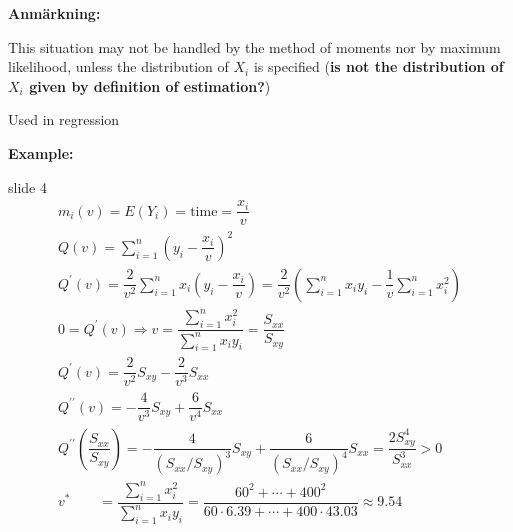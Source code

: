 \par\bigskip
\noindent\textbf{Anmärkning:}\par
\noindent  This situation may not be handled by the method of moments nor by maximum likelihood, unless the distribution of $X_i$ is specified (\textbf{is not the distribution of $X_i$ given by definition of estimation?})
\par\bigskip
\noindent Used in regression 
\par\bigskip
\noindent\textbf{Example:}\par
slide 4
\begin{equation*}
  \begin{gathered}
    m_i(v) = E(Y_i) = \text{time} = \dfrac{x_i}{v}\\
    Q(v) = \sum_{i=1}^{n}\left(y_i-\dfrac{x_i}{v}\right)^2\\
    Q^{\prime}(v) = \dfrac{2}{v^2}\sum_{i=1}^{n}x_i\left(y_i-\dfrac{x_i}{v}\right) = \dfrac{2}{v^2}\left(\sum_{i=1}^{n}x_iy_i-\dfrac{1}{v}\sum_{i=1}^{n}x_i^2\right)\\
    0  =Q^{\prime}(v)\Rightarrow v = \dfrac{\sum_{i=1}^{n}x_i^2}{\sum_{i=1}^{n}x_iy_i} = \dfrac{S_{xx}}{S_{xy}}\\
    Q^{\prime}(v) = \dfrac{2}{v^2}S_{xy}-\dfrac{2}{v^3}S_{xx}\\
    Q^{\prime\prime}(v) = -\dfrac{4}{v^3}S_{xy}+\dfrac{6}{v^4}S_{xx}\\
    Q^{\prime\prime}\left(\dfrac{S_{xx}}{S_{xy}}\right) = -\dfrac{4}{(S_{xx}/S_{xy})^3}S_{xy}+\dfrac{6}{(S_{xx}/S_{xy})^4}S_{xx} = \dfrac{2S_{xy}^4}{S_{xx}^3}>0\\
    v^*\qquad= \dfrac{\sum_{i=1}^{n}x_i^2}{\sum_{i=1}^{n}x_iy_i} = \dfrac{60^2+\cdots+400^2}{60\cdot6.39+\cdots+400\cdot43.03}\approx 9.54
  \end{gathered}
\end{equation*}
\par\bigskip
